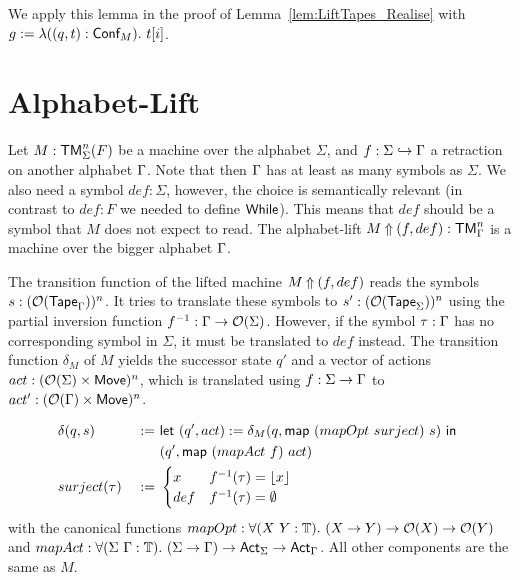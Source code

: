 We apply this lemma in the proof of Lemma~\ref{lem:LiftTapes_Realise} with $g := \lambda ((q,t):\textsf{Conf}_M).~t[i]$.



\section{Alphabet-Lift}
\label{sec:sigma-Lift}

Let $M : \textsf{TM}_\Sigma^n(F)$ be a machine over the alphabet $\Sigma$, and $f : \Sigma \hookrightarrow \Gamma$ a retraction on another alphabet $\Gamma$.
Note that then $\Gamma$ has at least as many symbols as $\Sigma$.  We also need a symbol $def:\Sigma$, however, the choice is semantically relevant (in
contrast to $def:F$ we needed to define $\textsf{While}$).  This means that $def$ should be a symbol that $M$ does not expect to read.  The alphabet-lift
$M \mathbin{\Uparrow} (f,def) : \textsf{TM}_\Gamma^n$ is a machine over the bigger alphabet $\Gamma$.

The transition function of the lifted machine $M \mathbin{\Uparrow} (f,def)$ reads the symbols $s:(\mathcal{O}(\textsf{Tape}_\Gamma))^n$.  It tries to translate these
symbols to $s':(\mathcal{O}(\textsf{Tape}_\Sigma))^n$ using the partial inversion function $f^{-1} : \Gamma \rightarrow \mathcal{O}(\Sigma)$.  However, if the symbol
$\tau:\Gamma$ has no corresponding symbol in $\Sigma$, it must be translated to $def$ instead.  The transition function $\delta_M$ of $M$ yields the
successor state $q'$ and a vector of actions $act: (\mathcal{O}(\Sigma) \times \textsf{Move})^n$, which is translated using $f:\Sigma\rightarrow\Gamma$ to
$act' : (\mathcal{O}(\Gamma) \times \textsf{Move})^n$.

\begin{definition}
  \label{def:LiftAlphabet}
  \begin{alignat*}{2}
    &\delta(q,s)    &~:=~& \Let{(q', act) := \delta_M(q, \map{(mapOpt~surject)}{s})}{\\%
    &               &~  ~& (q', \map{(mapAct~f)}{act})} \\
    & surject(\tau) &~:=~&
    \begin{cases}
      x   & f^{-1}(\tau) = \Some{x} \\
      def & f^{-1}(\tau) = \None
    \end{cases}
  \end{alignat*}
  with the canonical functions $mapOpt: \forall (X~Y:\mathbb{T}).~ (X \rightarrow Y) \rightarrow \mathcal{O}(X) \rightarrow \mathcal{O}(Y)$ and
  $mapAct : \forall (\Sigma~\Gamma:\mathbb{T}).~(\Sigma\rightarrow\Gamma) \rightarrow \textsf{Act}_\Sigma \rightarrow \textsf{Act}_\Gamma$.  All other components are the same as $M$.
\end{definition}

